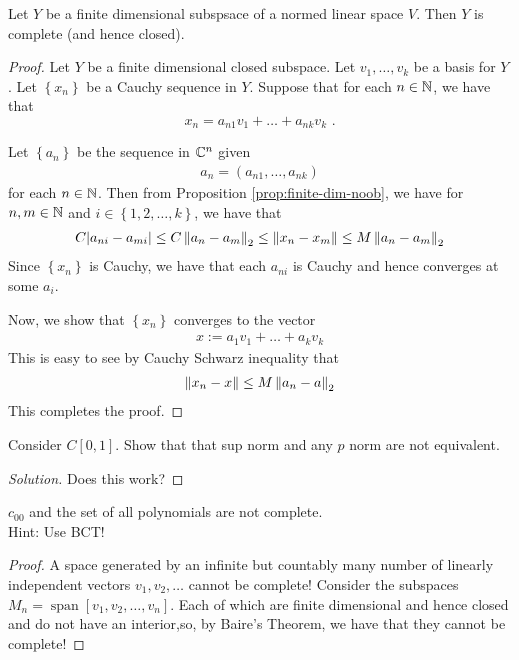    \begin{corollary}
	Let $Y$ be a finite dimensional subspsace of a normed linear space $V$. Then $Y$ is complete (and hence closed).
    \end{corollary}
    \begin{proof}
	Let $Y$ be a finite dimensional closed subspace. Let $v_{1}, \ldots , v_{k}$ be a basis for $Y$. Let $\left\{ x_{n} \right\}$ be a Cauchy sequence in $Y$.
    Suppose that for each $n \in \mathbb N$, we have that
    \begin{equation*}
	x_{n} = a_{n1} v_{1} + \ldots + a_{nk} v_{k}\text{ .}
    \end{equation*}

    Let $\left\{ a_{n} \right\}$ be the sequence in $\mathbb C ^{n}$ given
    \begin{align*}
	a_{n} = \left( a_{n1}, \ldots , a_{nk} \right)
    \end{align*}
    for each $n\in \mathbb N$.
    Then from Proposition \ref{prop:finite-dim-noob}, we have for $n,m \in \mathbb N$ and $i\in \left\{ 1,2, \ldots , k \right\}$, we have that
    \begin{align*}
	C |a_{ni}-a_{mi}| \le C \left\lVert a_{n}-a_{m} \right\rVert_{2} \le \left\lVert x_{n} - x_{m} \right\rVert \le M \left\lVert a_{n}-a_{m} \right\rVert_{2}
    \end{align*}
    Since $\left\{ x_{n} \right\}$ is Cauchy, we have that each $a_{ni}$ is Cauchy and hence converges at some $a_{i}$.

    Now, we show that $\left\{ x_{n} \right\}$ converges to the vector
    \begin{align*}
	x:=a_{1} v_{1} + \ldots + a_{k} v_{k}
    \end{align*}
    This is easy to see by Cauchy Schwarz inequality that
    \begin{align*}
	\left\lVert x_{n} -x \right\rVert \le M \left\lVert a_{n} - a \right\rVert_{2}
    \end{align*}
    This completes the proof.
    \end{proof}
     
    \begin{exercise}
	Consider $C[0,1]$. Show that that sup norm and any $p$ norm are not equivalent.
    \end{exercise}
    \begin{proof}[Solution]
	Does this work?
    \end{proof}

    \begin{exercise}
	$c_{00}$ and the set of all polynomials are not complete.\\
	Hint: Use BCT!
    \end{exercise}
    \begin{proof}
	A space generated by an infinite but countably many number of linearly independent vectors $v_{1}, v_2 , \ldots$ cannot be complete! Consider the subspaces $M_{n} =\operatorname{span} \left[ v_{1}, v_{2}, \ldots , v_{n} \right]$. Each of which are finite dimensional and hence closed and do not have an interior,so, by Baire's Theorem, we have that they cannot be complete!
    \end{proof}
